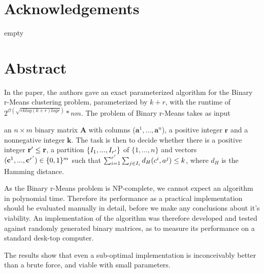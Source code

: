 \documentclass[a4paper]{article}
\begin{document}
%
%


%
%
\section*{Acknowledgements}
empty
\newpage

%
%
\section*{Abstract}
In the \cite{fomin_golovach_panolan_2020} paper, the authors gave an exact parameterized
algorithm for the Binary r-Means clustering problem, parameterized by $k+r$, with the runtime of
$2^{\mathcal{O} (\sqrt{rk log(k+r) logr})}*nm$. The problem of Binary r-Means takes as input

an $n \times m$ binary matrix \textbf{A} with columns ($\textbf{a}^1,...,\textbf{a}^n$), a positive 
integer $\textbf{r}$ and a nonnegative integer $\textbf{k}$. 
The task is then to decide whether there is a positive integer $\textbf{r}\sp{\prime} \leq \textbf{r}$, 
a partition $\{I_1, ..., I_{r\sp{\prime}}\}$ of $\{1,...,n\}$ and vectors 
$(\textbf{c}^1,...,\textbf{c}^{r\sp{\prime}}) \in \{0,1\}^m$ such that 
$\sum_{i = 1}^{r\sp{\prime}} \sum_{j \in I_i} d_H(c^i, a^j) \leq k $, where $d_H$ is the Hamming distance.

As the Binary r-Means problem is NP-complete, we cannot expect an algorithm in polynomial time. Therefore its performance 
as a practical implementation should be evaluated manually in detail, before we make any conclusions about it's viability.
An implementation of the algorithm was therefore developed and tested against randomly generated binary matrices, 
as to measure its performance on a standard desk-top computer. 

The results show that even a sub-optimal implementation is inconceivably better than a brute force, and 
viable with small parameters.

\newpage

%
%
\tableofcontents
\newpage

%
%
\listofalgorithms
\newpage


\end{document}
